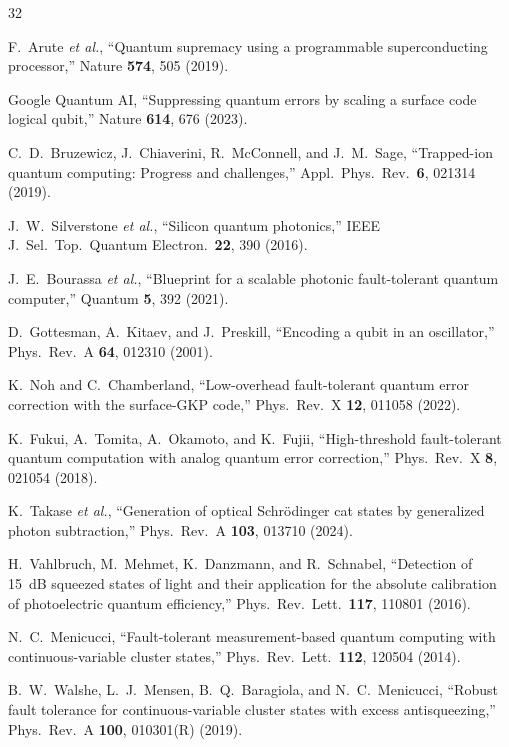 \documentclass[twocolumn,showpacs,preprintnumbers,amsmath,amssymb,superscriptaddress]{revtex4-2}
\begin{document}
\begin{thebibliography}{32}

F.~Arute \emph{et al.},
``Quantum supremacy using a programmable superconducting processor,''
Nature \textbf{574}, 505 (2019).

Google Quantum AI,
``Suppressing quantum errors by scaling a surface code logical qubit,''
Nature \textbf{614}, 676 (2023).

C.~D.~Bruzewicz, J.~Chiaverini, R.~McConnell, and J.~M.~Sage,
``Trapped-ion quantum computing: Progress and challenges,''
Appl.\ Phys.\ Rev.\ \textbf{6}, 021314 (2019).

J.~W.~Silverstone \emph{et al.},
``Silicon quantum photonics,''
IEEE J.\ Sel.\ Top.\ Quantum Electron.\ \textbf{22}, 390 (2016).

J.~E.~Bourassa \emph{et al.},
``Blueprint for a scalable photonic fault-tolerant quantum computer,''
Quantum \textbf{5}, 392 (2021).

D.~Gottesman, A.~Kitaev, and J.~Preskill,
``Encoding a qubit in an oscillator,''
Phys.\ Rev.\ A \textbf{64}, 012310 (2001).

K.~Noh and C.~Chamberland,
``Low-overhead fault-tolerant quantum error correction with the surface-GKP code,''
Phys.\ Rev.\ X \textbf{12}, 011058 (2022).

K.~Fukui, A.~Tomita, A.~Okamoto, and K.~Fujii,
``High-threshold fault-tolerant quantum computation with analog quantum error correction,''
Phys.\ Rev.\ X \textbf{8}, 021054 (2018).

K.~Takase \emph{et al.},
``Generation of optical Schr\"odinger cat states by generalized photon subtraction,''
Phys.\ Rev.\ A \textbf{103}, 013710 (2024).

H.~Vahlbruch, M.~Mehmet, K.~Danzmann, and R.~Schnabel,
``Detection of 15~dB squeezed states of light and their application for the absolute calibration of photoelectric quantum efficiency,''
Phys.\ Rev.\ Lett.\ \textbf{117}, 110801 (2016).

N.~C.~Menicucci,
``Fault-tolerant measurement-based quantum computing with continuous-variable cluster states,''
Phys.\ Rev.\ Lett.\ \textbf{112}, 120504 (2014).

B.~W.~Walshe, L.~J.~Mensen, B.~Q.~Baragiola, and N.~C.~Menicucci,
``Robust fault tolerance for continuous-variable cluster states with excess antisqueezing,''
Phys.\ Rev.\ A \textbf{100}, 010301(R) (2019).


\end{thebibliography}
\end{document}

